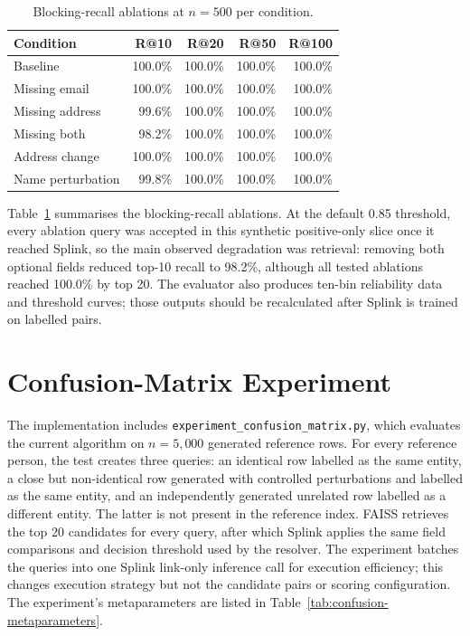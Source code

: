 \documentclass[conference]{IEEEtran}
\begin{document}
\begin{table}[t]
\centering
\caption{Blocking-recall ablations at $n=500$ per condition.}
\label{tab:section7-ablations}
\small
\begin{tabular}{lrrrr}
\toprule
Condition & R@10 & R@20 & R@50 & R@100 \\
\midrule
Baseline & 100.0\% & 100.0\% & 100.0\% & 100.0\% \\
Missing email & 100.0\% & 100.0\% & 100.0\% & 100.0\% \\
Missing address & 99.6\% & 100.0\% & 100.0\% & 100.0\% \\
Missing both & 98.2\% & 100.0\% & 100.0\% & 100.0\% \\
Address change & 100.0\% & 100.0\% & 100.0\% & 100.0\% \\
Name perturbation & 99.8\% & 100.0\% & 100.0\% & 100.0\% \\
\bottomrule
\end{tabular}
\end{table}

Table~\ref{tab:section7-ablations} summarises the blocking-recall ablations. At the default 0.85 threshold, every ablation query was accepted in this synthetic positive-only slice once it reached Splink, so the main observed degradation was retrieval: removing both optional fields reduced top-10 recall to 98.2\%, although all tested ablations reached 100.0\% by top 20. The evaluator also produces ten-bin reliability data and threshold curves; those outputs should be recalculated after Splink is trained on labelled pairs.

\section{Confusion-Matrix Experiment}
The implementation includes \texttt{experiment\_confusion\_matrix.py}, which evaluates the current algorithm on $n=5{,}000$ generated reference rows. For every reference person, the test creates three queries: an identical row labelled as the same entity, a close but non-identical row generated with controlled perturbations and labelled as the same entity, and an independently generated unrelated row labelled as a different entity. The latter is not present in the reference index. FAISS retrieves the top 20 candidates for every query, after which Splink applies the same field comparisons and decision threshold used by the resolver. The experiment batches the queries into one Splink link-only inference call for execution efficiency; this changes execution strategy but not the candidate pairs or scoring configuration. The experiment's metaparameters are listed in Table~\ref{tab:confusion-metaparameters}.
\end{document}
